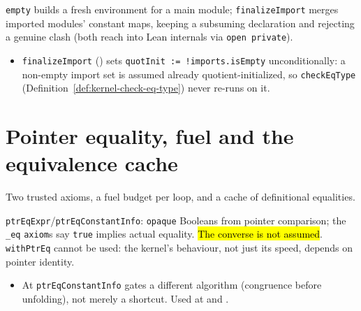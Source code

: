 \begin{definition}
\label{def:kernel-env-empty-import}
\leanok
{} \texttt{empty} builds a fresh environment for a main module;
\texttt{finalizeImport} merges imported modules' constant maps, keeping a subsuming declaration
and rejecting a genuine clash (both reach into Lean internals via \texttt{open private}).
\begin{itemize}
\item {} \texttt{finalizeImport} () sets
\texttt{quotInit := !imports.isEmpty} unconditionally: a non-empty import set is assumed already
quotient-initialized, so \texttt{checkEqType} (Definition~\ref{def:kernel-check-eq-type}) never
re-runs on it.
\end{itemize}
\end{definition}

\section{Pointer equality, fuel and the equivalence cache}

Two trusted axioms, a fuel budget per loop, and a cache of definitional equalities.

\begin{definition}
\label{axiom:kernel-ptr-eq}
\leanok
{}

 \texttt{ptrEqExpr}/\texttt{ptrEqConstantInfo}: \texttt{opaque} Booleans from
pointer comparison; the \texttt{\_eq} \texttt{axiom}s say \texttt{true} implies actual equality.
\hl{The converse is not assumed}. \texttt{withPtrEq} cannot be used: the kernel's behaviour, not
just its speed, depends on pointer identity.
\begin{itemize}
\item {} At  \texttt{ptrEqConstantInfo} gates a
different algorithm (congruence before unfolding), not merely a shortcut. Used at
 and
.
\end{itemize}
\end{definition}


